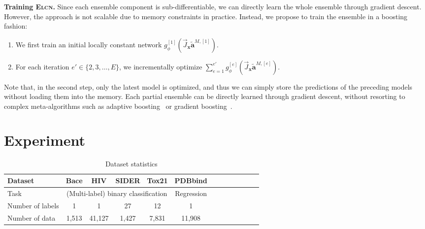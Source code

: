 \documentclass{article} \usepackage{iclr2020_conference,times}
\def\va{{\bm{a}}}
\def\vx{{\bm{x}}}
\begin{document}
\textbf{Training \textsc{Elcn}.} Since each ensemble component is sub-differentiable, we can directly learn the whole ensemble through gradient descent. However, the approach is not scalable due to memory constraints in practice. Instead, we propose to train the ensemble in a boosting fashion:
\begin{enumerate}
\vspace{-3mm}
    \item We first train an initial locally constant network $g^{[1]}_{\phi}(\vec{J}_\vx \tilde \va^{M, [1]})$.
\vspace{-2mm}
    \item For each iteration $e' \in \{2,3,\dots,E\}$, we incrementally optimize $\sum_{e=1}^{e'} g^{[e]}_{\phi}(\vec{J}_\vx \tilde \va^{M, [e]})$.
\vspace{-3mm}
\end{enumerate}
Note that, in the second step, only the latest model is optimized, and thus we can simply store the predictions of the preceding models without loading them into the memory. Each partial ensemble can be directly learned through gradient descent, without resorting to complex meta-algorithms such as adaptive boosting~\citep{freund1997decision} or gradient boosting~\citep{friedman2001greedy}.  \vspace{-1mm}













 \section{Experiment}
\begin{table}
\caption{Dataset statistics}\label{tab:statistics}
  \centering
  \begin{tabular}{lcccccccccccc}
    \toprule
    \small Dataset                & \small {Bace} & \small {HIV} & \small {SIDER} & \small {Tox21} & \small {PDBbind}\\
    \midrule
    \small Task                   & \multicolumn{4}{c}{(Multi-label) binary classification} & \small Regression \\
    \small Number of labels       & \small 1 & \small 1 & \small 27 & \small 12 & \small 1 \\
    \small Number of data         & \small 1,513 & \small 41,127 & \small 1,427 & \small 7,831 & \small 11,908 \\
\bottomrule
  \end{tabular}
\end{table}
\end{document}
